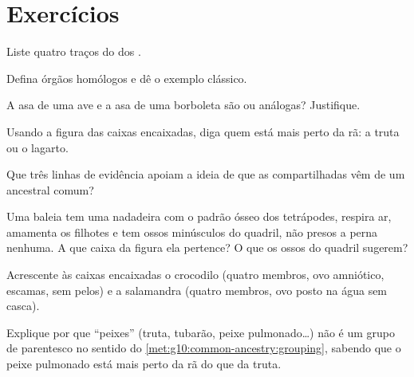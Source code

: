 \section{Exercícios}

\begin{exercise}[$\star$]\label{exo:g10:common-ancestry:1}
Liste quatro traços do  dos .
\end{exercise}

\begin{exercise}[$\star$]\label{exo:g10:common-ancestry:2}
Defina órgãos homólogos e dê o exemplo clássico.
\end{exercise}

\begin{exercise}[$\star$]\label{exo:g10:common-ancestry:3}
A asa de uma ave e a asa de uma borboleta são  ou análogas?
Justifique.
\end{exercise}

\begin{exercise}[$\star$]\label{exo:g10:common-ancestry:4}
Usando a figura das caixas encaixadas, diga quem está mais perto da rã:
a truta ou o lagarto.
\end{exercise}

\begin{exercise}[$\star$]\label{exo:g10:common-ancestry:5}
Que três linhas de evidência apoiam a ideia de que as 
compartilhadas vêm de um ancestral comum?
\end{exercise}

\begin{exercise}[$\star\star$]\label{exo:g10:common-ancestry:6}
Uma baleia tem uma nadadeira com o padrão ósseo dos tetrápodes, respira
ar, amamenta os filhotes e tem ossos minúsculos do quadril, não presos
a perna nenhuma. A que caixa da figura ela pertence? O que os ossos do
quadril sugerem?
\end{exercise}

\begin{exercise}[$\star\star$]\label{exo:g10:common-ancestry:7}
Acrescente às caixas encaixadas o crocodilo (quatro membros, ovo
amniótico, escamas, sem pelos) e a salamandra (quatro membros, ovo
posto na água sem casca).
\end{exercise}

\begin{exercise}[$\star\star$]\label{exo:g10:common-ancestry:8}
Explique por que ``peixes'' (truta, tubarão, peixe pulmonado\dots) não
é um grupo de parentesco no sentido do
\cref{met:g10:common-ancestry:grouping}, sabendo que o peixe pulmonado
está mais perto da rã do que da truta.
\end{exercise}

